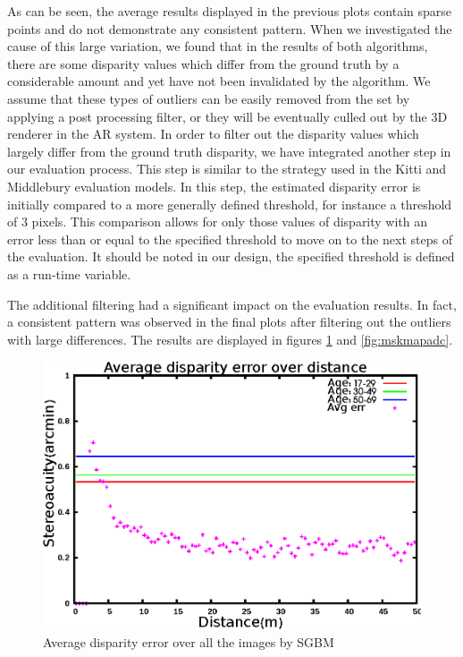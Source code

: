 As can be seen, the average results displayed in the previous plots contain sparse points and 
do not demonstrate any consistent pattern. When we investigated the cause of this large variation, we found that in
the results of both algorithms, there are some disparity values which differ from the ground truth 
by a considerable amount and yet have not been invalidated by the
algorithm. We assume that these types of outliers can be easily removed from the set by applying a post processing filter, or 
they will be eventually culled out by the 3D renderer in the AR system. 
In order to filter out the disparity values which largely differ from the ground truth disparity, we have integrated another 
step in our evaluation process. This step is similar to the strategy used in the Kitti and Middlebury evaluation models.
In this step, the estimated disparity error is initially compared to a more generally defined threshold, for instance a threshold of 3 pixels.
This comparison allows for only those values of disparity with an error less than or equal to the specified threshold to 
move on to the next steps of the evaluation. It should be noted in our design, the specified threshold is defined as a run-time variable. 

The additional filtering had a significant impact on the evaluation results. In fact, a consistent pattern was observed in the final plots after filtering out the
outliers with large differences. The results are displayed in
figures \ref{fig:mskmapsgbm} and \ref{fig:mskmapadc}.

\begin{figure}[H]
\centering
\includegraphics[scale=0.8]{sgbmmsk3}
\caption{Average disparity error over all the images by SGBM}
\label{fig:mskmapsgbm}
\end{figure} 

